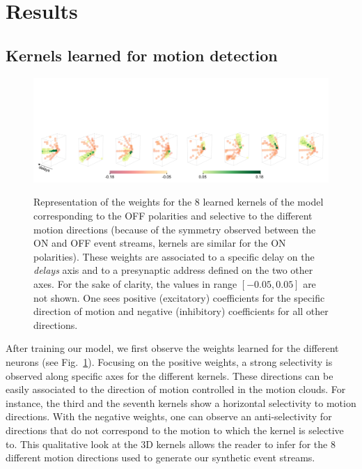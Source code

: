 \documentclass[default]{sn-jnl}%
\theoremstyle{thmstyleone}%
\theoremstyle{thmstyletwo}%
\theoremstyle{thmstylethree}%
\newcommand{\seeFig}[1]{see Fig.~\ref{fig:#1}}%
\begin{document}
\section{Results}
\label{sec:results}
%
\subsection{Kernels learned for motion detection}
%
\begin{figure}[ht!]
    {\centering
    \vspace{-3cm}
    \includegraphics[width=\linewidth]{figures/3D_kernels_oneline.png}
    }
    \caption{
    	Representation of the weights for the $8$ learned kernels of the model corresponding to the OFF polarities and selective to the different motion directions
	(because of the symmetry observed between the ON and OFF event streams, kernels are similar for the ON polarities). These weights are associated to a specific delay on the \textit{delays} axis and to a presynaptic address defined on the two other axes.
	For the sake of clarity, the values in range $[-0.05, 0.05]$ are not shown. One sees positive (excitatory) coefficients for the specific direction of motion and negative (inhibitory) coefficients for all other directions.
	}
    \label{fig:kernels}
\end{figure} 
%
%
After training our model, we first observe the weights learned for the different neurons (\seeFig{kernels}). Focusing on the positive weights, a strong selectivity is observed along specific axes for the different kernels. These directions can be easily associated to the direction of motion controlled in the motion clouds. For instance, the third and the seventh kernels show a horizontal selectivity to motion directions.
%
With the negative weights, one can observe an anti-selectivity for directions that do not correspond to the motion to which the kernel is selective to. This qualitative look at the 3D kernels allows the reader to infer for the $8$ different motion directions used to generate our synthetic event streams.
\end{document}
